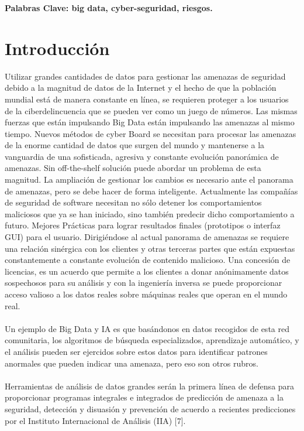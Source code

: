 \documentclass[journal]{IEEEtran}
\begin{document}
\textbf{Palabras Clave: big data, cyber-seguridad, riesgos.}\\ 


\IEEEpeerreviewmaketitle



\section{Introducción}

 Utilizar grandes cantidades de datos para gestionar las amenazas de seguridad debido a la magnitud de datos de la Internet y el hecho de que la población mundial está de manera constante en línea, se requieren proteger a los usuarios de la ciberdelincuencia que se pueden ver como un juego de números. Las mismas fuerzas que están impulsando Big Data están impulsando las amenazas al mismo tiempo. Nuevos métodos de cyber Board se necesitan  para procesar las amenazas  de la enorme cantidad de datos que surgen del mundo y mantenerse a la vanguardia de una sofisticada, agresiva y constante evolución panorámica de amenazas. Sin off-the-shelf solución puede abordar un problema de esta magnitud. La ampliación de gestionar los cambios es necesario ante el panorama de amenazas, pero se debe hacer de forma inteligente. Actualmente las compañías de seguridad de software necesitan no sólo detener los comportamientos maliciosos que ya se han iniciado, sino también predecir dicho comportamiento a futuro. Mejores Prácticas para lograr resultados finales (prototipos o interfaz GUI) para el usuario. Dirigiéndose al actual panorama de amenazas se requiere una relación sinérgica con los clientes y otras terceras partes que están expuestas constantemente a constante evolución de contenido malicioso. Una concesión de licencias, es un acuerdo que permite a los clientes a donar anónimamente datos sospechosos para su análisis y con la ingeniería inversa se puede proporcionar acceso valioso a los datos reales sobre máquinas reales que operan en el mundo real.\\ \\
Un ejemplo de Big Data y IA es que basándonos en datos recogidos de esta red comunitaria, los algoritmos de búsqueda especializados, aprendizaje automático, y el análisis pueden ser ejercidos sobre estos datos para identificar patrones anormales que pueden indicar una amenaza, pero eso son otros rubros.\\ \\
Herramientas de análisis de datos grandes serán la primera línea de defensa para proporcionar programas integrales e integrados de predicción de amenaza a la seguridad, detección y disuasión y prevención de acuerdo a recientes predicciones por el Instituto Internacional de Análisis (IIA) [7].\\ \\
\end{document}
